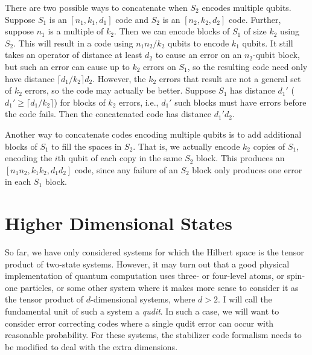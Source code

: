There are two possible ways to concatenate when $S_2$ encodes multiple
qubits.  Suppose $S_1$ is an $[n_1, k_1, d_1]$ code and $S_2$ is an $[n_2,
k_2, d_2]$ code.  Further, suppose $n_1$ is a multiple of $k_2$.  Then we
can encode blocks of $S_1$ of size $k_2$ using $S_2$.  This will result in a
code using $n_1 n_2/k_2$ qubits to encode $k_1$ qubits.  It still takes an
operator of distance at least $d_2$ to cause an error on an $n_2$-qubit
block, but such an error can cause up to $k_2$ errors on $S_1$, so the
resulting code need only have distance $\lceil d_1/k_2 \rceil d_2$.
However, the $k_2$ errors that result are not a general set of $k_2$ errors,
so the code may actually be better.  Suppose $S_1$ has distance $d_1'$
($d_1' \geq \lceil d_1/k_2 \rceil$) for blocks of $k_2$ errors, i.e., $d_1'$
such blocks must have errors before the code fails.  Then the concatenated
code has distance $d_1' d_2$.

Another way to concatenate codes encoding multiple qubits is to add
additional blocks of $S_1$ to fill the spaces in $S_2$.  That is, we actually
encode $k_2$ copies of $S_1$, encoding the $i$th qubit of each copy in the
same $S_2$ block.  This produces an $[n_1 n_2, k_1 k_2, d_1 d_2]$ code,
since any failure of an $S_2$ block only produces one error in each $S_1$
block.

\section{Higher Dimensional States}
\label{sec-qudits}

So far, we have only considered systems for which the Hilbert space is the
tensor product of two-state systems.  However, it may turn out that a good
physical implementation of quantum computation uses three- or four-level
atoms, or spin-one particles, or some other system where it makes more sense
to consider it as the tensor product of $d$-dimensional systems, where
$d > 2$.  I will call the fundamental unit of such a system a {\em qudit}.
In such a case, we will want to consider error correcting codes where a
single qudit error can occur with reasonable probability.  For these systems,
the stabilizer code formalism needs to be modified to deal with the extra
dimensions.

